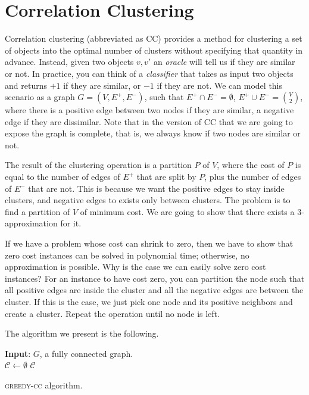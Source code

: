 \section{Correlation Clustering}

Correlation clustering (abbreviated as CC) provides a method for clustering a set of objects into the optimal number of clusters without specifying that quantity in advance. Instead, given two objects $v, v'$ an \emph{oracle} will tell us if they are similar or not. In practice, you can think of a \emph{classifier} that takes as input two objects and returns $+1$ if they are similar, or $-1$ if they are not. We can model this scenario as a graph $G=(V, E^+, E^-)$, such that $E^+ \cap E^- = \emptyset$, $E^+ \cup E^- = \binom{V}{2}$, where there is a positive edge between two nodes if they are similar, a negative edge if they are dissimilar. Note that in the version of CC that we are going to expose the graph is complete, that is, we always know if two nodes are similar or not.

The result of the clustering operation is a partition $P$ of $V$, where the cost of $P$ is equal to the number of edges of $E^+$ that are split by $P$, plus the number of edges of $E^-$ that are not. This is because we want the positive edges to stay inside clusters, and negative edges to exists only between clusters. The problem is to find a partition of $V$ of minimum cost. We are going to show that there exists a $3$-approximation for it.

If we have a problem whose cost can shrink to zero, then we have to show that zero cost instances can be solved in polynomial time; otherwise, no approximation is possible. Why is the case we can easily solve zero cost instances? For an instance to have cost zero, you can partition the node such that all positive edges are inside the cluster and all the negative edges are between the cluster. If this is the case, we just pick one node and its positive neighbors and create a cluster. Repeat the operation until no node is left.

The algorithm we present is the following.
\begin{algorithm}
	\textbf{Input}: $G$, a fully connected graph.\\
	$\mathcal{C} \gets \emptyset$\;
	\Return $\mathcal{C}$\;
	\caption{\textsc{greedy-cc} algorithm.}
\end{algorithm}

